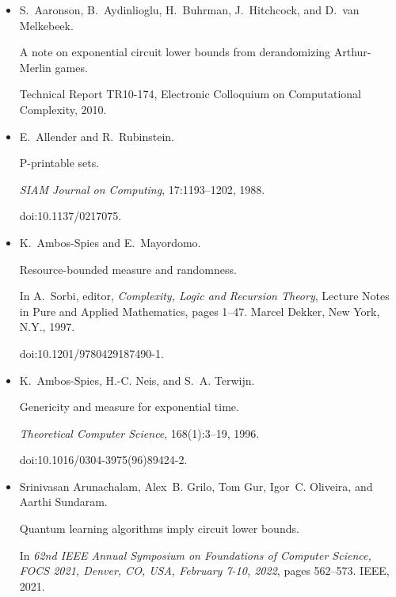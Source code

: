 \begin{itemize}


\item[] 
[1]

S. Aaronson, B. Aydinlioglu, H. Buhrman, J. Hitchcock, and D. van Melkebeek.


A note on exponential circuit lower bounds from derandomizing
Arthur-Merlin games.


Technical Report TR10-174, Electronic Colloquium on Computational
Complexity, 2010.





\item[] 
[2]

E. Allender and R. Rubinstein.


P-printable sets.


\emph{SIAM Journal on Computing}, 17:1193–1202, 1988.


doi:10.1137/0217075.





\item[] 
[3]

K. Ambos-Spies and E. Mayordomo.


Resource-bounded measure and randomness.


In A. Sorbi, editor, \emph{Complexity, Logic and Recursion Theory},
Lecture Notes in Pure and Applied Mathematics, pages 1–47. Marcel Dekker,
New York, N.Y., 1997.


doi:10.1201/9780429187490-1.





\item[] 
[4]

K. Ambos-Spies, H.-C. Neis, and S. A. Terwijn.


Genericity and measure for exponential time.


\emph{Theoretical Computer Science}, 168(1):3–19, 1996.


doi:10.1016/0304-3975(96)89424-2.





\item[] 
[5]

Srinivasan Arunachalam, Alex B. Grilo, Tom Gur, Igor C. Oliveira, and Aarthi
Sundaram.


Quantum learning algorithms imply circuit lower bounds.


In \emph{62nd IEEE Annual Symposium on Foundations of Computer
Science, FOCS 2021, Denver, CO, USA, February 7-10, 2022}, pages 562–573.
IEEE, 2021.



\end{itemize}
